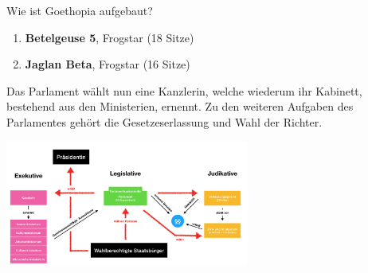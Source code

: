 \documentclass{sasbase}
\begin{document}
\begin{question}{Wie ist Goethopia aufgebaut?}
\begin{enumerate}[label=-]
		\item \textbf{Betelgeuse 5}, Frogstar (18 Sitze)
		\item \textbf{Jaglan Beta}, Frogstar (16 Sitze)
	\end{enumerate}
	Das Parlament w\"{a}hlt nun eine Kanzlerin, welche wiederum ihr Kabinett, bestehend aus den Ministerien, ernennt. Zu den weiteren Aufgaben des Parlamentes geh\"{o}rt die Gesetzeserlassung und Wahl der Richter.
	\begin{center}
	\includegraphics[width=8cm]{Verfassung.png}
\end{center}
\end{question}
\end{document}
